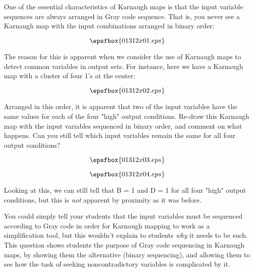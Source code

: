 

One of the essential characteristics of Karnaugh maps is that the input variable sequences are always arranged in Gray code sequence.  That is, you never see a Karnaugh map with the input combinations arranged in binary order:

$$\epsfbox{01312x01.eps}$$

The reason for this is apparent when we consider the use of Karnaugh maps to detect common variables in output sets.  For instance, here we have a Karnaugh map with a cluster of four 1's at the center:

$$\epsfbox{01312x02.eps}$$

Arranged in this order, it is apparent that two of the input variables have the same values for each of the four "high" output conditions.  Re-draw this Karnaugh map with the input variables sequenced in binary order, and comment on what happens.  Can you still tell which input variables remain the same for all four output conditions?

$$\epsfbox{01312x03.eps}$$







$$\epsfbox{01312x04.eps}$$

Looking at this, we can still tell that B = 1 and D = 1 for all four "high" output conditions, but this is {\it not} apparent by proximity as it was before.







You could simply tell your students that the input variables must be sequenced according to Gray code in order for Karnaugh mapping to work as a simplification tool, but this wouldn't explain to students {\it why} it needs to be such.  This question shows students the purpose of Gray code sequencing in Karnaugh maps, by showing them the alternative (binary sequencing), and allowing them to see how the task of seeking noncontradictory variables is complicated by it.




